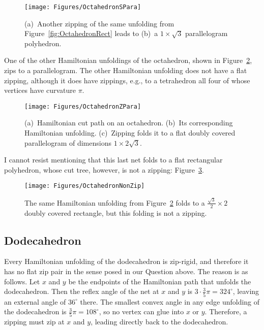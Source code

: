 \pdfoutput=1  \documentclass[]{article}
\newcommand{\figlab}[1]{\label{fig:#1}}
\newcommand{\figref}[1]{\ref{fig:#1}}
\begin{document}
\begin{figure}[htbp]
\centering
\texttt{[image: Figures/OctahedronSPara]}
\caption{(a)~Another zipping of the same unfolding from
  Figure~\protect\figref{OctahedronRect}
leads to (b)~a  $1 \times \sqrt{3}$ parallelogram polyhedron.}
\figlab{OctahedronSPara}
\end{figure}


One of the other Hamiltonian unfoldings of the octahedron,
shown in Figure~\figref{OctahedronZPara},
zips to a parallelogram.
The other Hamiltonian unfolding does not have a flat zipping,
although it does have zippings, e.g., to a tetrahedron all four of
whose
vertices have curvature $\pi$.

\begin{figure}[htbp]
\centering
\texttt{[image: Figures/OctahedronZPara]}
\caption{(a)~Hamiltonian cut path on an octahedron.
(b)~Its corresponding Hamiltonian unfolding.
(c)~Zipping folds it to
a flat doubly covered parallelogram
of dimensions $1 \times 2\sqrt{3}$.}
\figlab{OctahedronZPara}
\end{figure}


I cannot resist mentioning that this last net folds to a flat rectangular
polyhedron, whose cut tree, however, is not a zipping:
Figure~\figref{OctahedronNonZip}.
\begin{figure}[htbp]
\centering
\texttt{[image: Figures/OctahedronNonZip]}
\caption{The same Hamiltonian unfolding from
  Figure~\protect\figref{OctahedronZPara}
folds to a $\frac{\sqrt{3}}{2} \times 2$ doubly covered rectangle,
but this folding is not a zipping.}
\figlab{OctahedronNonZip}
\end{figure}


\subsection{Dodecahedron}
Every Hamiltonian unfolding of the dodecahedron is zip-rigid,
and therefore it has no flat zip pair in the sense posed in our
Question above.
The reason is as follows.
Let $x$ and $y$ be the endpoints of the Hamiltonian path that unfolds
the dodecahedron.  Then the reflex angle of the net at $x$ and $y$
is $3 \cdot \frac{3}{5} \pi = 324^\circ$, leaving an external angle of
$36^\circ$ there.
The smallest convex angle in any edge unfolding of the dodecahedron
is $\frac{3}{5} \pi =108^\circ$, so no vertex can glue into $x$ or $y$.
Therefore, a zipping must zip at $x$ and $y$, leading directly back
to the dodecahedron.
\end{document}
